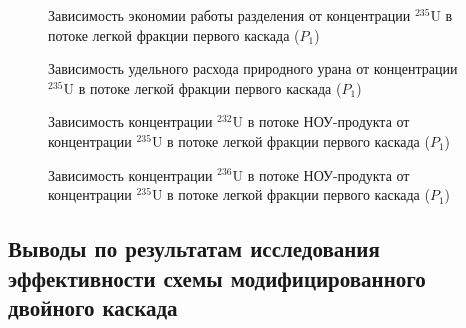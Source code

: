\begin{figure}[ht]
  \centering
  \begin{minipage}{.5\textwidth}
    \centering
    
\caption{{Зависимость экономии работы разделения от концентрации $^{235}$U в потоке легкой фракции первого каскада ($P_1$){\label{SW_l}}}}
  \end{minipage}%
  \begin{minipage}{.5\textwidth}
    \centering
    
\caption{{Зависимость удельного расхода природного урана от концентрации $^{235}$U в потоке легкой фракции первого каскада ($P_1$){\label{Fnu}}}}
\end{minipage}
\end{figure}


\begin{figure}[ht]
  \centering
  \begin{minipage}{.5\textwidth}
    \centering
    
    \caption{{Зависимость концентрации $^{232}$U в потоке НОУ-продукта от концентрации $^{235}$U в потоке легкой фракции первого каскада ($P_1$){\label{C232P}}}}
  \end{minipage}%
  \begin{minipage}{.5\textwidth}
    \centering
    
    \caption{{Зависимость концентрации $^{236}$U в потоке НОУ-продукта от концентрации $^{235}$U в потоке легкой фракции первого каскада ($P_1$){\label{C236P}}}}
\end{minipage}
\end{figure}





\subsection{Выводы по результатам исследования эффективности схемы модифицированного двойного каскада}


